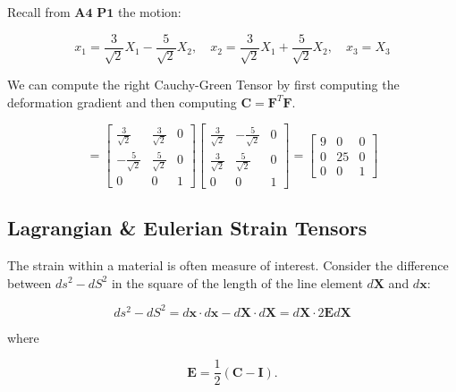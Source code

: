 \documentclass[a4paper]{article}
\begin{document}
Recall from $\mathbf{A4}$ $\mathbf{P1}$ the motion:

\begin{equation}
    x_1 = \frac{3}{\sqrt{2}} X_1 - \frac{5}{\sqrt{2}} X_2, \quad x_2 = \frac{3}{\sqrt{2}} X_1 + \frac{5}{\sqrt{2}} X_2, \quad
    x_3 = X_3
\end{equation}
 
We can compute the right Cauchy-Green Tensor by first computing the deformation gradient and then computing $\mathbf{C} = \mathbf{F}^T \mathbf{F}$.

\begin{equation*}
    [C_{AB}] = 
    \begin{bmatrix}
      \frac{3}{\sqrt{2}} & \frac{3}{\sqrt{2}} & 0 \\
      - \frac{5}{\sqrt{2}} & \frac{5}{\sqrt{2}} & 0 \\
      0 & 0 & 1
    \end{bmatrix}
    \begin{bmatrix}
      \frac{3}{\sqrt{2}} & - \frac{5}{\sqrt{2}} & 0 \\
      \frac{3}{\sqrt{2}} & \frac{5}{\sqrt{2}} & 0 \\
      0 & 0 & 1
    \end{bmatrix}
    =
    \begin{bmatrix}
      9 & 0 & 0 \\
      0 & 25 & 0 \\
      0 & 0 & 1
    \end{bmatrix}
\end{equation*}


\subsection{Lagrangian \& Eulerian Strain Tensors}
The strain within a material is often measure of interest. Consider the difference between $ds^2 - dS^2$ in the square of the length of the line element $d\mathbf{X}$ and $d\mathbf{x}$: 

\begin{equation}
    ds^2 - dS^2 = d\mathbf{x} \cdot d\mathbf{x} - d\mathbf{X} \cdot d\mathbf{X} = d\mathbf{X} \cdot 2\mathbf{E}d\mathbf{X}
\end{equation}

where 

\begin{equation}
    \mathbf{E} = \frac{1}{2} (\mathbf{C} - \mathbf{I}). 
\end{equation}
\end{document}
